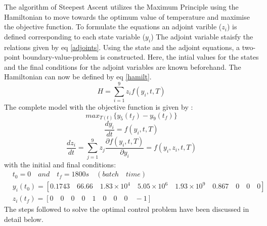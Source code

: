 \documentclass[3p,times,authoryear]{elsarticle}
\begin{document}
The algorithm of Steepest Ascent utilizes the Maximum Principle using the Hamiltonian to move towards the optimum value of temperature and maximise the objective function. To formulate the equations an adjoint varible ($z_{i}$) is defined corresponding to each state variable ($y_{i}$) The adjoint variable staisfy the relations given by eq \ref{adjoints}. Using the state and the adjoint equations, a two-point boundary-value-problem is constructed. Here, the intial values for the states and the final conditions for the adjoint variables are known beforehand.
The Hamiltonian can now be defined by eq \ref{hamilt}.
\begin{equation} 
H = \sum_{i = 1}^{9} z_{i}f(y_{i},t,T) \label{hamilt}
\end{equation}
The complete model with the objective function is given by :
\begin{equation} \label{obj}
max_{T(t)} \lbrace{ y_{5}(t_{f}) - y_{9}(t_{f})}\rbrace 
\end{equation}
\begin{equation}
\frac{dy_{i}}{dt} = f(y_{i},t,T) 
\end{equation}
\begin{equation} \label{adjoints}
\frac{dz_{i}}{dt} = \sum_{j=1}^{9} z_{j}\frac{\partial f(y_{i},t,T)}{\partial y_{i}} = f(y_{i},z_{i},t,T) 
\end{equation}
with the initial and final conditions:
\begin{align*}
&t_{0} = 0 \quad and \quad t_{f} = 1800s \quad(batch \quad time) \\
&y_{i}(t_{0}) = \left[ 0.1743 \quad 66.66 \quad 1.83\times10^{4}\quad 5.05\times10^{6} \quad 1.93\times10^{9} \quad 0.867 \quad 0 \quad 0 \quad 0 \right] \\
&z_{i}(t_{f}) = \left[  0 \quad 0 \quad 0 \quad 0 \quad 1 \quad 0 \quad 0 \quad 0 \quad -1 \right] 
\end{align*}
The steps followed to solve the optimal control problem have been discussed in detail below.
\end{document}
